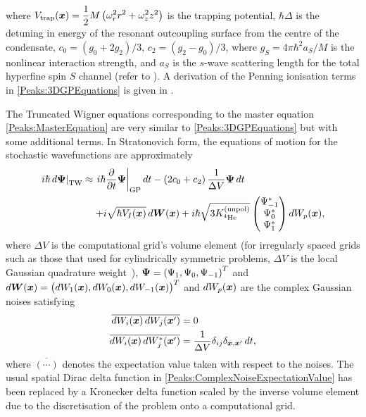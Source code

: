 where $\displaystyle V_\text{trap}(\bm{x}) = \frac{1}{2} M \left(\omega_r^2 r^2 + \omega_z^2 z^2 \right)$ is the trapping potential, $\hbar \Delta$ is the detuning in energy of the resonant outcoupling surface from the centre of the condensate, $c_0 = (g_0 + 2 g_2)/3$, $c_2 = (g_2 - g_0)/3$, where $g_S = 4 \pi \hbar^2 a_S/M$ is the nonlinear interaction strength, and $a_S$ is the $s$-wave scattering length for the total hyperfine spin $S$ channel (refer to ). A derivation of the Penning ionisation terms in \eqref{Peaks:3DGPEquations} is given in .

The Truncated Wigner equations corresponding to the master equation \eqref{Peaks:MasterEquation} are very similar to \eqref{Peaks:3DGPEquations} but with some additional terms. In Stratonovich form, the equations of motion for the stochastic wavefunctions are approximately
\begin{align}
    \label{Peaks:3DTWEquations}
    \begin{split}
        \left. i \hbar \,d\vect{\Psi}\right|_\text{TW} &\approx \left. i \hbar \frac{\partial }{\partial t}\vect{\Psi}\right|_\text{GP} dt - \left(2 c_0 + c_2 \right)\frac{1}{\Delta V}\vect{\Psi}\, dt\\
        &\relphantom{\approx} + i\sqrt{ \hbar V_I(\vect{x})} \,d\vect{W}(\vect{x}) + i \hbar\sqrt{3 \Kunpol}
        \begin{pmatrix}
            \Psi_{-1}^*\\
            \Psi_0^*\\
            \Psi_1^*
        \end{pmatrix} dW_p(\vect{x}),
    \end{split}
\end{align}
where $\Delta V$ is the computational grid's volume element (for irregularly spaced grids such as those that used for cylindrically symmetric problems, $\Delta V$ is the local Gaussian quadrature weight~\citep{Ronen:2006}), $\bm{\Psi} = \left(\Psi_1, \Psi_0, \Psi_{-1} \right)^T$ and $d \bm{W}(\bm{x}) = \big(dW_1(\bm{x}), dW_0(\bm{x}), dW_{-1}(\bm{x})\big)^T$ and $dW_p(\bm{x})$ are the complex Gaussian noises satisfying
\begin{align}
    \overline{dW_i(\vect{x})\, dW_j(\vect{x}')} &= 0 \\
    \overline{dW_i(\vect{x})\, dW_j^*(\vect{x}')} &= \frac{1}{\Delta V}\delta_{ij}\delta_{\vect{x},\vect{x}'}\,dt, \label{Peaks:ComplexNoiseExpectationValue}
\end{align}
where $\overline{(\cdots)}$ denotes the expectation value taken with respect to the noises. The usual spatial Dirac delta function in \eqref{Peaks:ComplexNoiseExpectationValue} has been replaced by a Kronecker delta function scaled by the inverse volume element due to the discretisation of the problem onto a computational grid.

